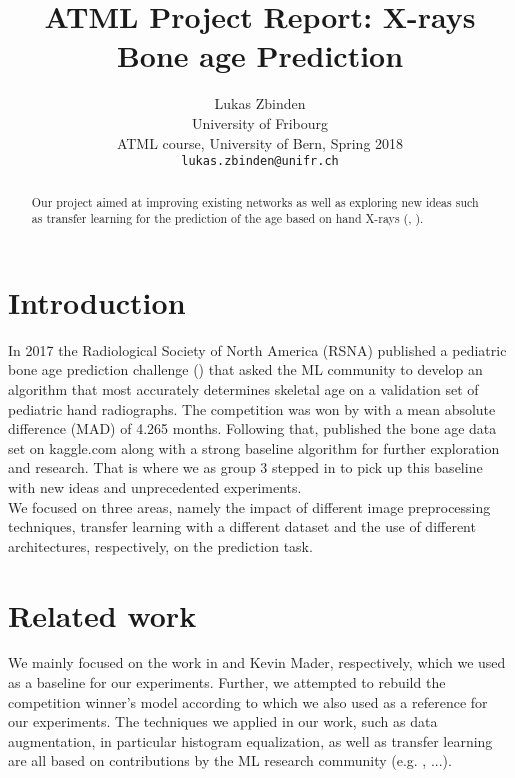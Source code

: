 \documentclass[10pt,twocolumn,letterpaper]{article}
\begin{document}
\title{ATML Project Report: X-rays Bone age Prediction}

\author{Lukas Zbinden\\
University of Fribourg\\
ATML course, University of Bern, Spring 2018\\
{\tt\small lukas.zbinden@unifr.ch}
}

\maketitle

\begin{abstract}
   Our project aimed at improving existing networks as well as exploring new ideas such as transfer learning for the prediction of the age based on hand X-rays (\cite{kaggleboneage}, \cite{stanfordboneage}).
\end{abstract}

\section{Introduction}
In 2017 the Radiological Society of North America (RSNA) published a pediatric bone age prediction challenge (\cite{rsnacompetition}) that asked the ML community to develop an algorithm that most accurately determines skeletal age on a validation set of pediatric hand radiographs. The competition was won by \cite{16bitrsnachallenge} with a mean absolute difference (MAD) of 4.265 months. Following that, \cite{kaggleboneage} published the bone age data set on kaggle.com along with a strong baseline algorithm for further exploration and research. That is where we as group 3 stepped in to pick up this baseline with new ideas and unprecedented experiments.\\ We focused on three areas, namely the impact of different image preprocessing techniques, transfer learning with a different dataset and the use of different architectures, respectively, on the prediction task.

\section{Related work}
We mainly focused on the work in \cite{kaggleboneage} and Kevin Mader, respectively, which we used as a baseline for our experiments. Further, we attempted to rebuild the competition winner's model according to \cite{16bitrsnachallenge} which we also used as a reference for our experiments. The techniques we applied in our work, such as data augmentation, in particular histogram equalization, as well as transfer learning are all based on contributions by the ML research community (e.g. \cite{1411.1792}, ...).
\end{document}
